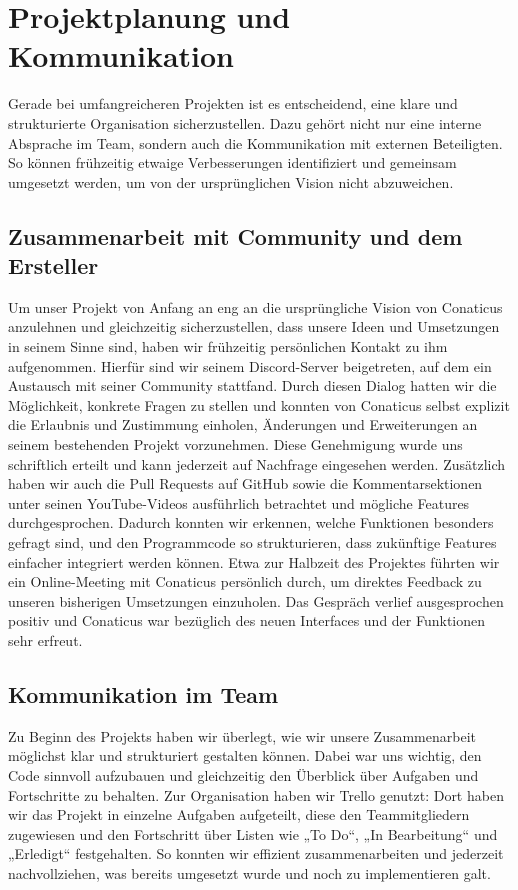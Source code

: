 \section{Projektplanung und Kommunikation}\label{sec:Absprache mit Ersteller und Community} 

Gerade bei umfangreicheren Projekten ist es entscheidend, eine klare und strukturierte Organisation
sicherzustellen. Dazu gehört nicht nur eine interne Absprache im Team, sondern auch die
Kommunikation mit externen Beteiligten. So können frühzeitig etwaige Verbesserungen identifiziert und gemeinsam umgesetzt werden, um von der ursprünglichen Vision nicht abzuweichen.

\subsection{Zusammenarbeit mit Community und dem Ersteller}\label{sec:Zusammenarbeit mit Community und dem Ersteller} %

Um unser Projekt von Anfang an eng an die ursprüngliche Vision von Conaticus anzulehnen und
gleichzeitig sicherzustellen, dass unsere Ideen und Umsetzungen in seinem Sinne sind, haben wir
frühzeitig persönlichen Kontakt zu ihm aufgenommen. Hierfür sind wir seinem Discord-Server
beigetreten, auf dem ein Austausch mit seiner Community stattfand. Durch diesen Dialog hatten wir
die Möglichkeit, konkrete Fragen zu stellen und konnten von Conaticus selbst explizit die Erlaubnis
und Zustimmung einholen, Änderungen und Erweiterungen an seinem bestehenden Projekt vorzunehmen. Diese Genehmigung wurde uns schriftlich erteilt und
kann jederzeit auf Nachfrage eingesehen werden. Zusätzlich haben wir auch die Pull Requests auf
GitHub sowie die Kommentarsektionen unter seinen YouTube-Videos ausführlich betrachtet und mögliche
Features durchgesprochen. Dadurch konnten wir erkennen, welche Funktionen besonders gefragt sind,
und den Programmcode so strukturieren, dass zukünftige Features einfacher integriert werden können.
Etwa zur Halbzeit des Projektes führten wir ein Online-Meeting mit Conaticus persönlich durch, um
direktes Feedback zu unseren bisherigen Umsetzungen einzuholen. Das Gespräch verlief ausgesprochen
positiv und Conaticus war bezüglich des neuen Interfaces und der Funktionen sehr erfreut.

\subsection{Kommunikation im Team}

Zu Beginn des Projekts haben wir überlegt, wie wir unsere Zusammenarbeit möglichst klar und
strukturiert gestalten können. Dabei war uns wichtig, den Code sinnvoll aufzubauen und gleichzeitig
den Überblick über Aufgaben und Fortschritte zu behalten. Zur Organisation haben wir Trello genutzt:
Dort haben wir das Projekt in einzelne Aufgaben aufgeteilt, diese den Teammitgliedern zugewiesen und
den Fortschritt über Listen wie „To Do“, „In Bearbeitung“ und „Erledigt“ festgehalten. So konnten
wir effizient zusammenarbeiten und jederzeit nachvollziehen, was bereits umgesetzt wurde und noch zu implementieren galt.
